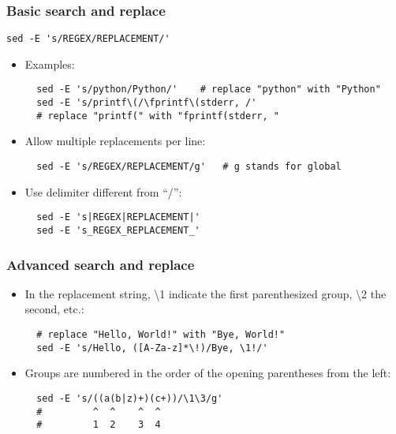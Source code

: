 \documentclass[12pt]{article}
\begin{document}
\subsubsection{Basic search and replace}

\begin{verbatim}
sed -E 's/REGEX/REPLACEMENT/'
\end{verbatim}

\begin{itemize}
  \item Examples:
  \begin{verbatim}
  sed -E 's/python/Python/'    # replace "python" with "Python"
  sed -E 's/printf\(/\fprintf\(stderr, /' 
  # replace "printf(" with "fprintf(stderr, "
  \end{verbatim}
  
  \item Allow multiple replacements per line:
  \begin{verbatim}
  sed -E 's/REGEX/REPLACEMENT/g'   # g stands for global
  \end{verbatim}
  
  \item Use delimiter different from ``/'':
  \begin{verbatim}
  sed -E 's|REGEX|REPLACEMENT|'
  sed -E 's_REGEX_REPLACEMENT_'
  \end{verbatim}
\end{itemize}

\subsubsection{Advanced search and replace}

\begin{itemize}
  \item In the replacement string, \textbackslash1 indicate the first parenthesized group, \textbackslash2 the second, etc.:
  \begin{verbatim}
  # replace "Hello, World!" with "Bye, World!"
  sed -E 's/Hello, ([A-Za-z]*\!)/Bye, \1!/'
  \end{verbatim}
  
  \item Groups are numbered in the order of the opening parentheses from the left:
  \begin{verbatim}
  sed -E 's/((a(b|z)+)(c+))/\1\3/g'
  #         ^  ^    ^  ^
  #         1  2    3  4
  \end{verbatim}
\end{itemize}
\end{document}
